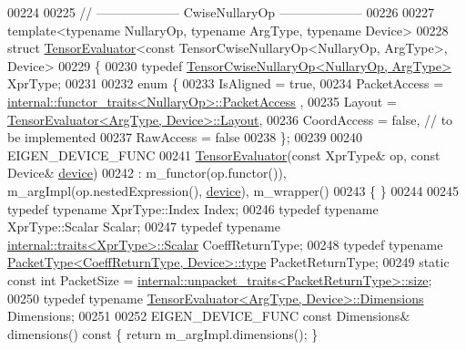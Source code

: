 \begin{DoxyCode}
00224 
00225 \textcolor{comment}{// -------------------- CwiseNullaryOp --------------------}
00226 
00227 \textcolor{keyword}{template}<\textcolor{keyword}{typename} NullaryOp, \textcolor{keyword}{typename} ArgType, \textcolor{keyword}{typename} Device>
00228 \textcolor{keyword}{struct }\hyperlink{struct_eigen_1_1_tensor_evaluator}{TensorEvaluator}<const TensorCwiseNullaryOp<NullaryOp, ArgType>, Device>
00229 \{
00230   \textcolor{keyword}{typedef} \hyperlink{class_eigen_1_1_tensor_cwise_nullary_op}{TensorCwiseNullaryOp<NullaryOp, ArgType>} XprType;
00231 
00232   \textcolor{keyword}{enum} \{
00233     IsAligned = \textcolor{keyword}{true},
00234     PacketAccess = \hyperlink{struct_eigen_1_1internal_1_1functor__traits}{internal::functor\_traits<NullaryOp>::PacketAccess}
      ,
00235     Layout = \hyperlink{struct_eigen_1_1_tensor_evaluator}{TensorEvaluator<ArgType, Device>::Layout},
00236     CoordAccess = \textcolor{keyword}{false},  \textcolor{comment}{// to be implemented}
00237     RawAccess = \textcolor{keyword}{false}
00238   \};
00239 
00240   EIGEN\_DEVICE\_FUNC
00241   \hyperlink{struct_eigen_1_1_tensor_evaluator}{TensorEvaluator}(\textcolor{keyword}{const} XprType& op, \textcolor{keyword}{const} Device& \hyperlink{struct_eigen_1_1_tensor_evaluator_a98b51809ed8f7a1f736eb7b952b9636e}{device})
00242       : m\_functor(op.functor()), m\_argImpl(op.nestedExpression(), \hyperlink{struct_eigen_1_1_tensor_evaluator_a98b51809ed8f7a1f736eb7b952b9636e}{device}), m\_wrapper()
00243   \{ \}
00244 
00245   \textcolor{keyword}{typedef} \textcolor{keyword}{typename} XprType::Index Index;
00246   \textcolor{keyword}{typedef} \textcolor{keyword}{typename} XprType::Scalar Scalar;
00247   \textcolor{keyword}{typedef} \textcolor{keyword}{typename} \hyperlink{struct_eigen_1_1internal_1_1traits}{internal::traits<XprType>::Scalar} CoeffReturnType;
00248   \textcolor{keyword}{typedef} \textcolor{keyword}{typename} \hyperlink{group___sparse_core___module}{PacketType<CoeffReturnType, Device>::type} 
      PacketReturnType;
00249   \textcolor{keyword}{static} \textcolor{keyword}{const} \textcolor{keywordtype}{int} PacketSize = 
      \hyperlink{struct_eigen_1_1internal_1_1unpacket__traits}{internal::unpacket\_traits<PacketReturnType>::size};
00250   \textcolor{keyword}{typedef} \textcolor{keyword}{typename} \hyperlink{struct_eigen_1_1_tensor_evaluator}{TensorEvaluator<ArgType, Device>::Dimensions}
       Dimensions;
00251 
00252   EIGEN\_DEVICE\_FUNC \textcolor{keyword}{const} Dimensions& dimensions()\textcolor{keyword}{ const }\{ \textcolor{keywordflow}{return} m\_argImpl.dimensions(); \}

\end{DoxyCode}

